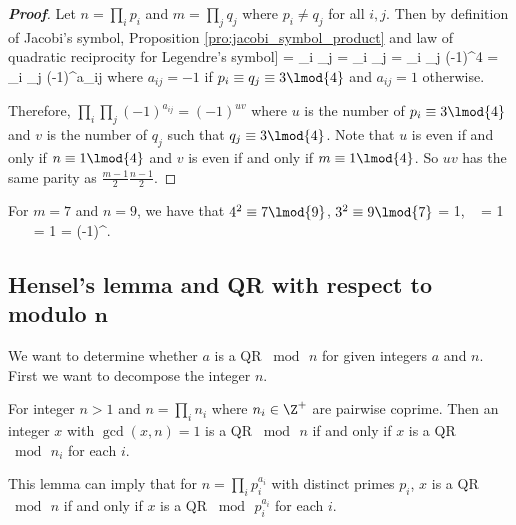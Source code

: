 \begin{proof}[\bf Proof]
Let $n = \prod_i p_i$ and $m = \prod_j q_j$ where $p_i \neq q_j$ for all $i,j$. Then by definition of Jacobi's symbol, Proposition \ref{pro:jacobi_symbol_product} and law of quadratic reciprocity for Legendre's symbol]\label{thm:law_of_quadratic_reciprocity_legendre_symbol}
\be
{} = \prod_i  \prod_j  = \prod_i \prod_j   = \prod_i \prod_j (-1)^{4} = \prod_i \prod_j (-1)^{a_{ij}}
\ee
where $a_{ij} =-1$ if $p_i \equiv q_j\equiv 3\lmod{4}$ and $a_{ij} = 1$ otherwise.

Therefore, $\prod_i\prod_j (-1)^{a_{ij}} = (-1)^{uv}$ where $u$ is the number of $p_i \equiv 3\lmod{4}$ and $v$ is the number of $q_j$ such that $q_j\equiv 3\lmod{4}$. Note that $u$ is even if and only if $n\equiv 1 \lmod{4}$ and $v$ is even if and only if $m\equiv 1 \lmod{4}$. So $uv$ has the same parity as $\frac{m-1}2\frac{n-1}2$.
\end{proof}


\begin{example}
For $m= 7$ and $n = 9$, we have that $4^2 \equiv 7\lmod{9}$, $3^2 \equiv 9\lmod{7}$
\be
{} = 1, \  = 1 \ \ra\ \   = 1 = (-1)^{}.
\ee
\end{example}


\subsection{Hensel's lemma and QR with respect to modulo $\mathbf{n}$}

We want to determine whether $a$ is a QR $\bmod\, n$ for given integers $a$ and $n$. First we want to decompose the integer $n$.

\begin{lemma}\label{lem:qr_product_iff_qr_coprime_factor}
For integer $n>1$ and $n = \prod_i n_i$ where $n_i\in \Z^+$ are pairwise coprime. Then an integer $x$ with $\gcd(x,n)=1$ is a QR $\bmod\, n$ if and only if $x$ is a QR $\bmod\, n_i$ for each $i$. 
\end{lemma}

\begin{remark}
This lemma can imply that for $n = \prod_i p_i^{a_i}$ with distinct primes $p_i$, $x$ is a QR $\bmod\, n$ if and only if $x$ is a QR $\bmod\, p_i^{a_i}$ for each $i$. 
\end{remark}

